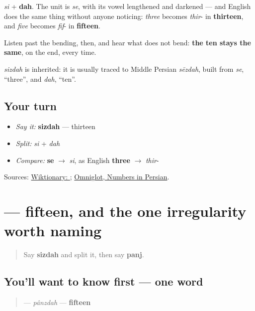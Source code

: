 \emph{si} + \textbf{dah}. The unit is \emph{se}, with its vowel lengthened and darkened — and English does the same thing without anyone noticing: \emph{three} becomes \emph{thir}- in \textbf{thirteen}, and \emph{five} becomes \emph{fif}- in \textbf{fifteen}.

Listen past the bending, then, and hear what does not bend: \textbf{the ten stays the same}, on the end, every time.

\begin{cousinweb}
\emph{sizdah} is inherited: it is usually traced to Middle Persian \emph{sēzdah}, built from \emph{se}, \textquotedblleft{}three\textquotedblright{}, and \emph{dah}, \textquotedblleft{}ten\textquotedblright{}.
\end{cousinweb}

\subsection*{Your turn}
\begin{itemize}
\raggedright
  \item \emph{Say it:} \textbf{sizdah} — thirteen
  \item \emph{Split:} \emph{si} + \emph{dah}
  \item \emph{Compare:} \textbf{se} $\to$ \emph{si}, as English \textbf{three} $\to$ \emph{thir}-
\end{itemize}

\begin{tcolorbox}[breakable,colback=teal!4,colframe=teal!35!black,title={Before you move on}]
Sources: \href{https://en.wiktionary.org/wiki/\%D8\%B3\%DB\%8C\%D8\%B2\%D8\%AF\%D9\%87}{Wiktionary: }; \href{https://www.omniglot.com/language/numbers/persian.htm}{Omniglot, Numbers in Persian}.
\end{tcolorbox}
\section[\texorpdfstring{\fa{پانزده} (pânzdah)}{پانزده (pânzdah)}]{ — fifteen, and the one irregularity worth naming}

\label{lesson:FA-C18-panzdah}



\begin{quote}
Say \textbf{sizdah} and split it, then say \textbf{panj}.
\end{quote}

\subsection*{You'll want to know first — one word}
\begin{quote}
\textbf{} — \emph{pânzdah} — \textbf{fifteen}
\end{quote}

